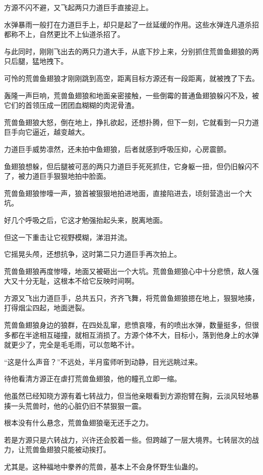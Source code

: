 \begin{this_body}
方源不闪不避，又飞起两只力道巨手直接迎上。

水弹暴雨一般打在力道巨手上，却只是起了一丝延缓的作用。这些水弹连凡道杀招都称不上，自然更比不上仙道杀招了。

与此同时，刚刚飞出去的两只力道大手，从底下抄上来，分别抓住荒兽鱼翅狼的两只后腿，猛地拽下。

可怜的荒兽鱼翅狼才刚刚跳到高空，距离目标方源还有一段距离，就被拽了下去。

轰隆一声巨响，荒兽鱼翅狼和地面亲密接触，一些倒霉的普通鱼翅狼躲闪不及，被它们的首领压成一团团血糊糊的肉泥骨渣。

荒兽鱼翅狼大怒，倒在地上，挣扎欲起，还想扑腾，但下一刻，它就看到一只力道巨手向它逼近，越变越大。

力道巨手威势凛然，还未拍中鱼翅狼，后者就感到呼吸压抑，心房震颤。

鱼翅狼想躲，但后腿被可恶的两只力道巨手死死抓住，它身躯一扭，但仍旧躲闪不了，被力道巨手狠狠地拍中脸面。

荒兽鱼翅狼惨嚎一声，狼首被狠狠地拍进地面，直接陷进去，顷刻营造出一个大坑。

好几个呼吸之后，它这才勉强抬起头来，脱离地面。

但这一下重击让它视野模糊，涕泪并流。

它摇晃头颅，还想抗争，这时第二只力道巨手再次拍上。

荒兽鱼翅狼再度惨嚎，地面又被砸出一个大坑。荒兽鱼翅狼心中十分悲愤，敌人强大又十分无耻，这根本不给它反映时间啊。

方源又飞出力道巨手，总共五只，齐齐飞舞，将荒兽鱼翅狼摁在地上，狠狠地揍，打得烟尘四起，地面迸裂。

荒兽鱼翅狼身边的狼群，在四处乱窜，悲愤哀嚎，有的喷出水弹，数量挺多，但很多都在半途相互碰撞，就相互消损了。方源个体不大，目标小，落到他身上的水弹就更少了，完全是毛毛雨，可以忽略不计。

“这是什么声音？”不远处，半月蛮师听到动静，目光远眺过来。

待他看清方源正在虐打荒兽鱼翅狼，他的瞳孔立即一缩。

他虽然已经知晓方源有着七转战力，但当他亲眼看到方源抱臂在胸，云淡风轻地暴揍一头荒兽时，他的心脏仍旧不禁狠狠一震。

根本没有什么悬念，荒兽鱼翅狼毫无还手之力。

若是方源只是六转战力，兴许还会胶着一些。但跨越了一层大境界。七转层次的战力，让荒兽鱼翅狼只能被动挨打。

尤其是。这种福地中豢养的荒兽，基本上不会身怀野生仙蛊的。


\end{this_body}
